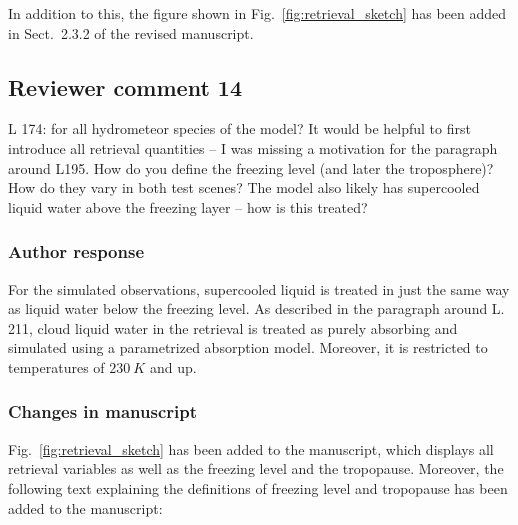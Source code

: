 In addition to this, the figure shown in Fig.~\ref{fig:retrieval_sketch} has been added
in Sect.~2.3.2 of the revised manuscript.


%

\subsection*{Reviewer comment 14}

L 174: for all hydrometeor species of the model? It would be helpful to first
introduce all retrieval quantities – I was missing a motivation for the
paragraph around L195. How do you define the freezing level (and later the
troposphere)? How do they vary in both test scenes? The model also likely has
supercooled liquid water above the freezing layer – how is this treated?

\subsubsection*{Author response}

For the simulated observations, supercooled liquid is treated in just the same
way as liquid water below the freezing level. As described in the paragraph
around L. 211, cloud liquid water in the retrieval is treated as purely
absorbing and simulated using a parametrized absorption model. Moreover, it is
restricted to temperatures of $230\ \unit{K}$ and up.

\subsubsection*{Changes in manuscript}

Fig.~\ref{fig:retrieval_sketch} has been added to the manuscript, which
displays all retrieval variables as well as the freezing level and the tropopause.
Moreover, the following text explaining the definitions of freezing level and
tropopause has been added to the manuscript:

